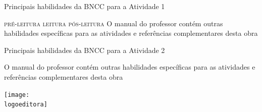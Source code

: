 \documentclass[smaller,professionalfonts,15pt]{beamer}
\begin{document}
\begin{frame}[plain]{Principais habilidades da BNCC para a Atividade 1}
\vspace{-2cm}

\textsc{pré-leitura}
\quad
\textsc{leitura}
\quad
\textsc{pós-leitura}
\vfill
	{\small O manual do professor contém outras habilidades específicas para as atividades e referências complementares desta obra}
\end{frame}

\begin{frame}[plain]{Principais habilidades da BNCC para a Atividade 2}
\vspace{-2cm}


\vfill
	{\small O manual do professor contém outras habilidades específicas para as atividades e referências complementares desta obra}

\end{frame}


\begin{frame}
\centering\hfill\texttt{[image: \\logoeditora]}
\end{frame}
\end{document}

